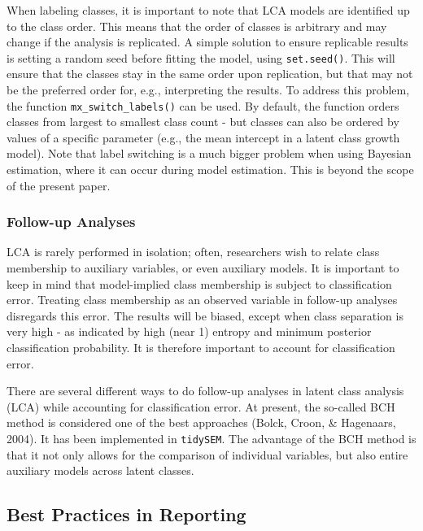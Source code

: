 \documentclass[
  ,man,floatsintext]{apa6}
\begin{document}
When labeling classes, it is important to note that LCA models are identified up to the class order.
This means that the order of classes is arbitrary and may change if the analysis is replicated.
A simple solution to ensure replicable results is setting a random seed before fitting the model, using \texttt{set.seed()}.
This will ensure that the classes stay in the same order upon replication,
but that may not be the preferred order for, e.g., interpreting the results.
To address this problem, the function \texttt{mx\_switch\_labels()} can be used.
By default, the function orders classes from largest to smallest class count - but classes can also be ordered by values of a specific parameter (e.g., the mean intercept in a latent class growth model).
Note that label switching is a much bigger problem when using Bayesian estimation,
where it can occur during model estimation.
This is beyond the scope of the present paper.

\hypertarget{follow-up-analyses}{%
\subsubsection{Follow-up Analyses}\label{follow-up-analyses}}

LCA is rarely performed in isolation;
often, researchers wish to relate class membership to auxiliary variables, or even auxiliary models.
It is important to keep in mind that model-implied class membership is subject to classification error.
Treating class membership as an observed variable in follow-up analyses disregards this error.
The results will be biased,
except when class separation is very high - as indicated by high (near 1) entropy and minimum posterior classification probability.
It is therefore important to account for classification error.

There are several different ways to do follow-up analyses in latent class analysis (LCA) while accounting for classification error.
At present, the so-called BCH method is considered one of the best approaches (Bolck, Croon, \& Hagenaars, 2004).
It has been implemented in \texttt{tidySEM}.
The advantage of the BCH method is that it not only allows for the comparison of individual variables, but also entire auxiliary models across latent classes.

\hypertarget{best-practices-in-reporting}{%
\subsection{Best Practices in Reporting}\label{best-practices-in-reporting}}
\end{document}
